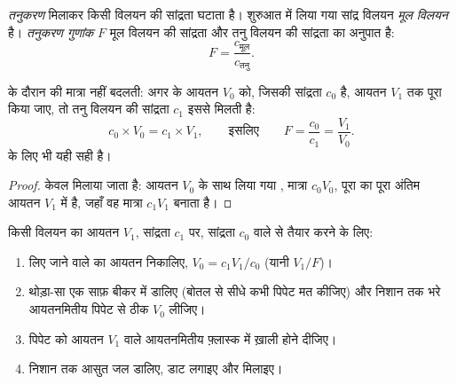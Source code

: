 \begin{definition}\label{def:g10:concentration-and-dilution:dilution}
\emph{तनुकरण}  मिलाकर किसी विलयन की सांद्रता घटाता है।
शुरुआत में लिया गया सांद्र विलयन
\emph{मूल विलयन} है। \emph{तनुकरण
गुणांक} $F$ मूल विलयन की सांद्रता और तनु
विलयन की सांद्रता का अनुपात है:
\[
  F = \frac{c_{\text{मूल}}}{c_{\text{तनु}}} .
\]
\end{definition}

\begin{proposition}[विलेय की मात्रा बनी रहती है]\label{prop:g10:concentration-and-dilution:kept}
 के दौरान  की मात्रा नहीं बदलती: अगर  के आयतन
$V_0$ को, जिसकी सांद्रता $c_0$ है, आयतन $V_1$ तक पूरा किया जाए, तो तनु विलयन की
सांद्रता $c_1$ इससे मिलती है:
\[
  c_0 \times V_0 = c_1 \times V_1,
  \qquad\text{इसलिए}\qquad
  F = \frac{c_0}{c_1} = \frac{V_1}{V_0} .
\]
 के लिए भी यही सही है।
\end{proposition}

\begin{proof}
केवल  मिलाया जाता है: आयतन $V_0$ के साथ लिया गया , मात्रा
$c_0 V_0$, पूरा का पूरा अंतिम आयतन $V_1$ में है, जहाँ वह
मात्रा $c_1 V_1$ बनाता है।
\end{proof}


\begin{method}\label{met:g10:concentration-and-dilution:diluting}
किसी विलयन का आयतन $V_1$, सांद्रता $c_1$ पर, सांद्रता $c_0$ वाले
 से तैयार करने के लिए:
\begin{enumerate}
  \item लिए जाने वाले  का आयतन निकालिए,
        $V_0 = c_1 V_1 / c_0$ (यानी $V_1 / F$)।
  \item थोड़ा-सा  एक साफ़ बीकर में डालिए (बोतल से सीधे कभी पिपेट
        मत कीजिए) और निशान तक भरे आयतनमितीय पिपेट से ठीक $V_0$
        लीजिए।
  \item पिपेट को आयतन $V_1$ वाले आयतनमितीय फ़्लास्क में ख़ाली होने दीजिए।
  \item निशान तक आसुत जल डालिए, डाट लगाइए और मिलाइए।
\end{enumerate}
\end{method}


